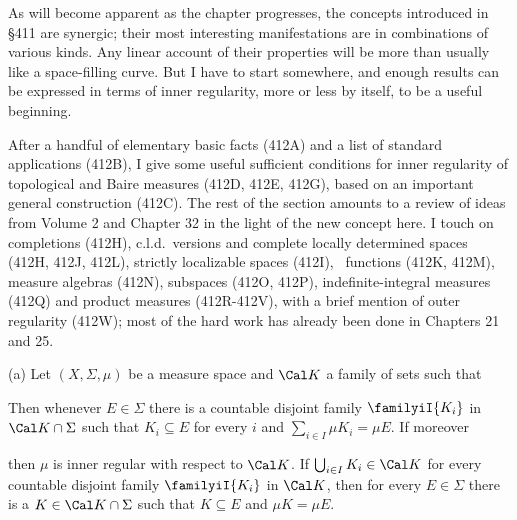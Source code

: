 
\def\chaptername{Topologies and measures I}
\def\sectionname{Inner regularity}


As will become apparent as the chapter progresses, the concepts
introduced in \S411 are synergic;  their most interesting manifestations
are in combinations of various kinds.   Any linear account of their
properties will be more than usually like a space-filling curve.   But I
have to start somewhere, and enough results can be expressed in terms of
inner regularity, more or less by itself, to be a useful beginning.

After a handful of elementary basic facts (412A) and a list of standard
applications (412B), I give some useful sufficient conditions for inner
regularity of topological and Baire measures (412D, 412E, 412G), based
on an important
general construction (412C).   The rest of the section amounts to a
review of ideas from Volume 2 and Chapter 32 in the light of the new
concept here.   I touch on completions (412H), c.l.d.\ versions and
complete locally determined spaces (412H, 412J, 412L), strictly
localizable spaces (412I), \imp\ functions (412K, 412M), measure
algebras (412N), subspaces (412O, 412P), indefinite-integral measures
(412Q) and product measures (412R-412V),
with a brief mention of outer regularity (412W);  most of the hard work
has already been done in Chapters 21 and 25.

 (a) Let $(X,\Sigma,\mu)$ be a measure space and
$\Cal K$ a family of sets such that


\noindent Then whenever $E\in\Sigma$ there is a countable disjoint
family $\familyiI{K_i}$ in $\Cal K\cap\Sigma$ such that $K_i\subseteq E$
for every $i$ and $\sum_{i\in I}\mu K_i=\mu E$.   If moreover


\noindent then $\mu$ is inner regular with respect to $\Cal K$.   If
$\bigcup_{i\in I}K_i\in\Cal K$ for every countable disjoint family
$\familyiI{K_i}$ in $\Cal K$, then for every $E\in\Sigma$ there is a
$K\in\Cal K\cap\Sigma$ such that $K\subseteq E$ and $\mu K=\mu E$.

